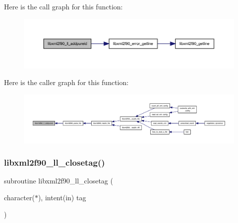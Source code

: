 Here is the call graph for this function\+:
\nopagebreak
\begin{figure}[H]
\begin{center}
\leavevmode
\includegraphics[width=350pt]{libxml2f90_8f90__pp_8f90_a339be1907542e3618239cb185bd5c386_cgraph}
\end{center}
\end{figure}
Here is the caller graph for this function\+:
\nopagebreak
\begin{figure}[H]
\begin{center}
\leavevmode
\includegraphics[width=350pt]{libxml2f90_8f90__pp_8f90_a339be1907542e3618239cb185bd5c386_icgraph}
\end{center}
\end{figure}
\mbox{\label{libxml2f90_8f90__pp_8f90_a23bfc785d957e044414ea18be75ac87a}} 
\subsubsection{\texorpdfstring{libxml2f90\+\_\+ll\+\_\+closetag()}{libxml2f90\_ll\_closetag()}}
{\footnotesize\ttfamily subroutine libxml2f90\+\_\+ll\+\_\+closetag (\begin{DoxyParamCaption}\item[{character($\ast$), intent(in)}]{tag }\end{DoxyParamCaption})}

